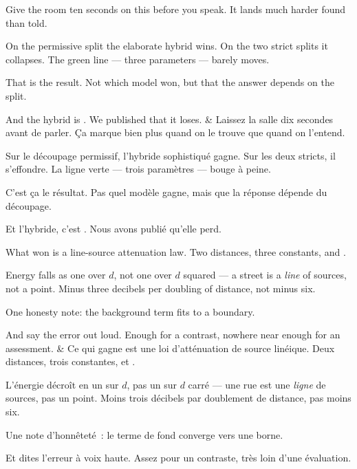 \documentclass[10pt,a4paper]{article}
\begin{document}
\begin{say}
Give the room ten seconds on this before you speak. It lands much harder found
than told.

 On the permissive split the elaborate hybrid wins.
On the two strict splits it collapses. The green line --- three parameters ---
barely moves.

 That is the result. Not which model won, but that the answer
depends on the split.

And the hybrid is . We
published that it loses.
&
Laissez la salle dix secondes avant de parler. Ça marque bien plus quand on le
trouve que quand on l'entend.

 Sur le découpage permissif,
l'hybride sophistiqué gagne. Sur les deux stricts, il s'effondre. La ligne verte
--- trois paramètres --- bouge à peine.

 C'est ça le résultat. Pas quel modèle gagne, mais que
la réponse dépende du découpage.

Et l'hybride, c'est . Nous
avons publié qu'elle perd.
\end{say}

\begin{say}
What won is a line-source attenuation law. Two distances, three constants, and
.

Energy falls as one over $d$, not one over $d$ squared --- a street is a
\emph{line} of sources, not a point. Minus three decibels per doubling of
distance, not minus six.

One honesty note: the background term fits to a boundary. 

And say the error out loud.  Enough for a contrast, nowhere near enough for an assessment.
&
Ce qui gagne est une loi d'atténuation de source linéique. Deux distances, trois
constantes, et .

L'énergie décroît en un sur $d$, pas un sur $d$ carré --- une rue est une
\emph{ligne} de sources, pas un point. Moins trois décibels par doublement de
distance, pas moins six.

Une note d'honnêteté~: le terme de fond converge vers une borne. 

Et dites l'erreur à voix haute.  Assez pour un contraste, très loin d'une évaluation.
\end{say}
\end{document}
